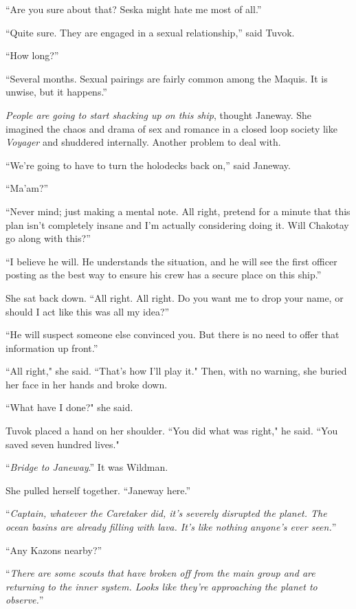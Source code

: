 \documentclass[twoside,letterpaper,12pt]{memoir}
\begin{document}
``Are you sure about that? Seska might hate me most of all.” 

``Quite sure. They are engaged in a sexual relationship,” said Tuvok. 

``How long?” 

``Several months. Sexual pairings are fairly common among the Maquis. It is unwise, but it happens.” 

\textit{People are going to start shacking up on this ship}, thought Janeway. She imagined the chaos and drama of sex and romance in a closed loop society like \textit{Voyager} and shuddered internally. Another problem to deal with. 

``We’re going to have to turn the holodecks back on,” said Janeway. 

``Ma’am?” 

``Never mind; just making a mental note. All right, pretend for a minute that this plan isn’t completely insane and I’m actually considering doing it. Will Chakotay go along with this?” 

``I believe he will. He understands the situation, and he will see the first officer posting as the best way to ensure his crew has a secure place on this ship.” 

She sat back down. ``All right. All right. Do you want me to drop your name, or should I act like this was all my idea?” 

``He will suspect someone else convinced you. But there is no need to offer that information up front.”

``All right," she said. ``That's how I'll play it." Then, with no warning, she buried her face in her hands and broke down.

``What have I done?" she said.

Tuvok placed a hand on her shoulder. ``You did what was right," he said. ``You saved seven hundred lives."

``\textit{Bridge to Janeway}.” It was Wildman. 

She pulled herself together. ``Janeway here.” 

``\textit{Captain, whatever the Caretaker did, it’s severely disrupted the planet. The ocean basins are already filling with lava. It’s like nothing anyone’s ever seen.}” 

``Any Kazons nearby?” 

``\textit{There are some scouts that have broken off from the main group and are returning to the inner system. Looks like they’re approaching the planet to observe.}” 
\end{document}
